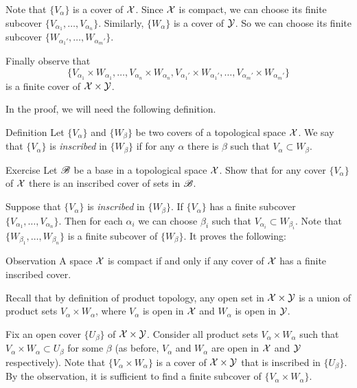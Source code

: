 Note that $\{V_\alpha\}$ is a cover of $\mathcal{X}$.
Since $\mathcal{X}$ is compact, we can choose its finite subcover $\{V_{\alpha_1},\dots,V_{\alpha_n}\}$.
Similarly, $\{W_\alpha\}$ is a cover of $\mathcal{Y}$.
So we can choose its finite subcover $\{W_{\alpha_1'},\dots,W_{\alpha_m'}\}$.

Finally observe that 
\[\{V_{\alpha_1}\times W_{\alpha_1},\dots,V_{\alpha_n}\times W_{\alpha_n},V_{\alpha_1'}\times W_{\alpha_1'},\dots,V_{\alpha_m'}\times W_{\alpha_m'}\}\] is a finite cover of $\mathcal{X}\times\mathcal{Y}$.
\qeds


In the proof, we will need the following definition.

\begin{thm}{Definition}
Let $\{V_\alpha\}$ and $\{W_\beta\}$ be two covers of a topological space $\mathcal{X}$.
We say that $\{V_\alpha\}$ is \emph{inscribed} in $\{W_\beta\}$ if for any $\alpha$ there is $\beta$ such that $V_\alpha\subset W_\beta$.
\end{thm}

\begin{thm}{Exercise}\label{ex:inscribed-cover-base}
Let $\mathscr{B}$ be a base in a topological space $\mathcal{X}$.
Show that for any cover $\{V_\alpha\}$ of $\mathcal{X}$ there is an inscribed cover of sets in $\mathscr{B}$.
\end{thm}

Suppose that $\{V_\alpha\}$ is \emph{inscribed} in $\{W_\beta\}$.
If $\{V_\alpha\}$ has a finite subcover $\{V_{\alpha_1},\dots,V_{\alpha_n}\}$.
Then for each $\alpha_i$ we can choose $\beta_i$ such that $V_{\alpha_i}\subset  W_{\beta_i}$.
Note that $\{W_{\beta_1},\dots,W_{\beta_n}\}$ is a finite subcover of $\{W_\beta\}$.
It proves the following:

\begin{thm}{Observation}\label{obs:inscribed-cover}
A space $\mathcal{X}$ is compact if and only if any cover of $\mathcal{X}$ has a finite inscribed cover. 
\end{thm}

Recall that by definition of product topology, any open set in $\mathcal{X}\times\mathcal{Y}$ is a union of product sets 
$V_\alpha\times W_\alpha$, where $V_\alpha$ is open in $\mathcal{X}$ and $W_\alpha$ is open in $\mathcal{Y}$.

Fix an open cover $\{U_\beta\}$ of $\mathcal{X}\times\mathcal{Y}$.
Consider all product sets $V_\alpha\times W_\alpha$ such that $V_\alpha\times W_\alpha\subset U_\beta$ for some $\beta$ (as before, $V_\alpha$ and $W_\alpha$ are open in $\mathcal{X}$ and $\mathcal{Y}$ respectively).
Note that $\{V_\alpha\times W_\alpha\}$ is a cover of $\mathcal{X}\times\mathcal{Y}$ that is inscribed in $\{U_\beta\}$.
By the observation, it is sufficient to find a finite subcover of $\{V_\alpha\times W_\alpha\}$.


